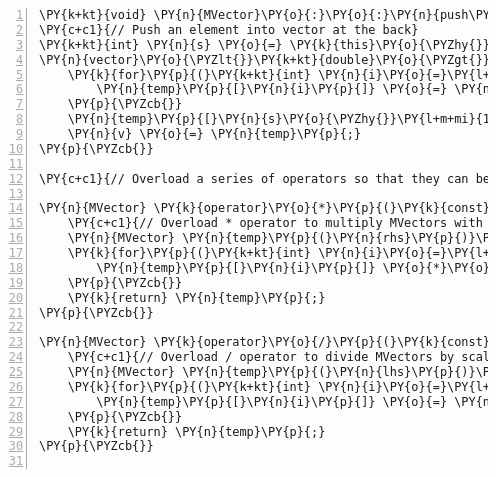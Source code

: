 \begin{Verbatim}[tabsize=2,commandchars=\\\{\},numbers=left,firstnumber=1,stepnumber=1]
\PY{k+kt}{void} \PY{n}{MVector}\PY{o}{:}\PY{o}{:}\PY{n}{push\PYZus{}back}\PY{p}{(}\PY{k+kt}{double} \PY{n}{x}\PY{p}{)} \PY{p}{\PYZob{}}
\PY{c+c1}{// Push an element into vector at the back}
\PY{k+kt}{int} \PY{n}{s} \PY{o}{=} \PY{k}{this}\PY{o}{\PYZhy{}}\PY{o}{\PYZgt{}}\PY{n}{size}\PY{p}{(}\PY{p}{)}\PY{o}{+}\PY{l+m+mi}{1}\PY{p}{;}
\PY{n}{vector}\PY{o}{\PYZlt{}}\PY{k+kt}{double}\PY{o}{\PYZgt{}} \PY{n}{temp}\PY{p}{(}\PY{n}{s}\PY{p}{)}\PY{p}{;}
	\PY{k}{for}\PY{p}{(}\PY{k+kt}{int} \PY{n}{i}\PY{o}{=}\PY{l+m+mi}{0}\PY{p}{;} \PY{n}{i}\PY{o}{\PYZlt{}}\PY{n}{s}\PY{o}{\PYZhy{}}\PY{l+m+mi}{1}\PY{p}{;} \PY{n}{i}\PY{o}{+}\PY{o}{+}\PY{p}{)} \PY{p}{\PYZob{}}
		\PY{n}{temp}\PY{p}{[}\PY{n}{i}\PY{p}{]} \PY{o}{=} \PY{n}{v}\PY{p}{[}\PY{n}{i}\PY{p}{]}\PY{p}{;}
	\PY{p}{\PYZcb{}}
	\PY{n}{temp}\PY{p}{[}\PY{n}{s}\PY{o}{\PYZhy{}}\PY{l+m+mi}{1}\PY{p}{]} \PY{o}{=} \PY{n}{x}\PY{p}{;}
	\PY{n}{v} \PY{o}{=} \PY{n}{temp}\PY{p}{;}
\PY{p}{\PYZcb{}}

\PY{c+c1}{// Overload a series of operators so that they can be used on MVector objects}

\PY{n}{MVector} \PY{k}{operator}\PY{o}{*}\PY{p}{(}\PY{k}{const} \PY{k+kt}{double}\PY{o}{\PYZam{}} \PY{n}{lhs}\PY{p}{,} \PY{k}{const} \PY{n}{MVector}\PY{o}{\PYZam{}} \PY{n}{rhs}\PY{p}{)} \PY{p}{\PYZob{}}
	\PY{c+c1}{// Overload * operator to multiply MVectors with scalars}
	\PY{n}{MVector} \PY{n}{temp}\PY{p}{(}\PY{n}{rhs}\PY{p}{)}\PY{p}{;}
	\PY{k}{for}\PY{p}{(}\PY{k+kt}{int} \PY{n}{i}\PY{o}{=}\PY{l+m+mi}{0}\PY{p}{;} \PY{n}{i}\PY{o}{\PYZlt{}}\PY{n}{temp}\PY{p}{.}\PY{n}{size}\PY{p}{(}\PY{p}{)}\PY{p}{;} \PY{n}{i}\PY{o}{+}\PY{o}{+}\PY{p}{)} \PY{p}{\PYZob{}}
		\PY{n}{temp}\PY{p}{[}\PY{n}{i}\PY{p}{]} \PY{o}{*}\PY{o}{=} \PY{n}{lhs}\PY{p}{;}
	\PY{p}{\PYZcb{}}
	\PY{k}{return} \PY{n}{temp}\PY{p}{;}
\PY{p}{\PYZcb{}}

\PY{n}{MVector} \PY{k}{operator}\PY{o}{/}\PY{p}{(}\PY{k}{const} \PY{n}{MVector}\PY{o}{\PYZam{}} \PY{n}{lhs}\PY{p}{,} \PY{k}{const} \PY{k+kt}{double}\PY{o}{\PYZam{}} \PY{n}{rhs}\PY{p}{)} \PY{p}{\PYZob{}}
	\PY{c+c1}{// Overload / operator to divide MVectors by scalars}
	\PY{n}{MVector} \PY{n}{temp}\PY{p}{(}\PY{n}{lhs}\PY{p}{)}\PY{p}{;}
	\PY{k}{for}\PY{p}{(}\PY{k+kt}{int} \PY{n}{i}\PY{o}{=}\PY{l+m+mi}{0}\PY{p}{;} \PY{n}{i}\PY{o}{\PYZlt{}}\PY{n}{temp}\PY{p}{.}\PY{n}{size}\PY{p}{(}\PY{p}{)}\PY{p}{;} \PY{n}{i}\PY{o}{+}\PY{o}{+}\PY{p}{)} \PY{p}{\PYZob{}}
		\PY{n}{temp}\PY{p}{[}\PY{n}{i}\PY{p}{]} \PY{o}{=} \PY{n}{temp}\PY{p}{[}\PY{n}{i}\PY{p}{]}\PY{o}{/}\PY{n}{rhs}\PY{p}{;}
	\PY{p}{\PYZcb{}}
	\PY{k}{return} \PY{n}{temp}\PY{p}{;}
\PY{p}{\PYZcb{}}


\end{Verbatim}
